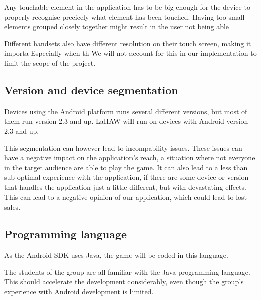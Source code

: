 
Any touchable element in the application has to be big enough for the device to properly recognise precicely what element has been touched. Having too small elements grouped closely together might result in the user not being able 

Different handsets also have different resolution on their touch screen, making it importa
Especially when th
We will not account for this in our implementation to limit the scope of the project. 


\subsection{Version and device segmentation}
Devices using the Android platform runs several different versions, but most of them run version 2.3 and up\cite{androidversions}. LaHAW will run on devices with Android version 2.3 and up.

This segmentation can however lead to incompability issues. These issues can have a negative impact on the application's reach, a situation where not everyone in the target audience are able to play the game. It can also lead to a less than sub-optimal experience with the application, if there are some device or version that handles the application just a little different, but with devastating effects. This can lead to a negative opinion of our application, which could lead to lost sales.



\subsection{Programming language}
As the Android SDK\cite{androidsdk} uses Java, the game will be coded in this language.

The students of the group are all familiar with the Java programming language. This should accelerate the development considerably, even though the group's experience with Android development is limited.